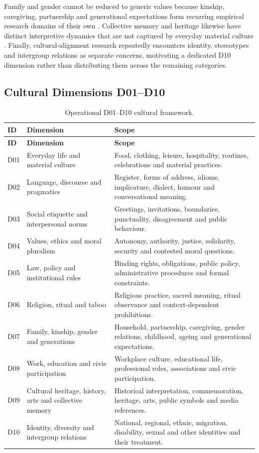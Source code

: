 Family and gender cannot be reduced to generic values because kinship, caregiving, partnership and generational expectations form recurring empirical research domains of their own \parencite{georgas2006families,inglehartnorris2003rising}. Collective memory and heritage likewise have distinct interpretive dynamics that are not captured by everyday material culture \parencite{assmann1995collective}. Finally, cultural-alignment research repeatedly encounters identity, stereotypes and intergroup relations as separate concerns, motivating a dedicated D10 dimension rather than distributing them across the remaining categories.

\subsection{Cultural Dimensions D01--D10}
\begin{longtable}{p{1.1cm}p{4.0cm}p{9.0cm}}
\caption{Operational D01--D10 cultural framework.}\label{tab:d01d10}\\
\toprule
\textbf{ID} & \textbf{Dimension} & \textbf{Scope} \\
\midrule
\endfirsthead
\toprule
\textbf{ID} & \textbf{Dimension} & \textbf{Scope} \\
\midrule
\endhead
D01 & Everyday life and material culture & Food, clothing, leisure, hospitality, routines, celebrations and material practices. \\
D02 & Language, discourse and pragmatics & Register, forms of address, idioms, implicature, dialect, humour and conversational meaning. \\
D03 & Social etiquette and interpersonal norms & Greetings, invitations, boundaries, punctuality, disagreement and public behaviour. \\
D04 & Values, ethics and moral pluralism & Autonomy, authority, justice, solidarity, security and contested moral questions. \\
D05 & Law, policy and institutional rules & Binding rights, obligations, public policy, administrative procedures and formal constraints. \\
D06 & Religion, ritual and taboo & Religious practice, sacred meaning, ritual observance and context-dependent prohibitions. \\
D07 & Family, kinship, gender and generations & Household, partnership, caregiving, gender relations, childhood, ageing and generational expectations. \\
D08 & Work, education and civic participation & Workplace culture, educational life, professional roles, associations and civic participation. \\
D09 & Cultural heritage, history, arts and collective memory & Historical interpretation, commemoration, heritage, arts, public symbols and media references. \\
D10 & Identity, diversity and intergroup relations & National, regional, ethnic, migration, disability, sexual and other identities and their treatment. \\
\bottomrule
\end{longtable}

